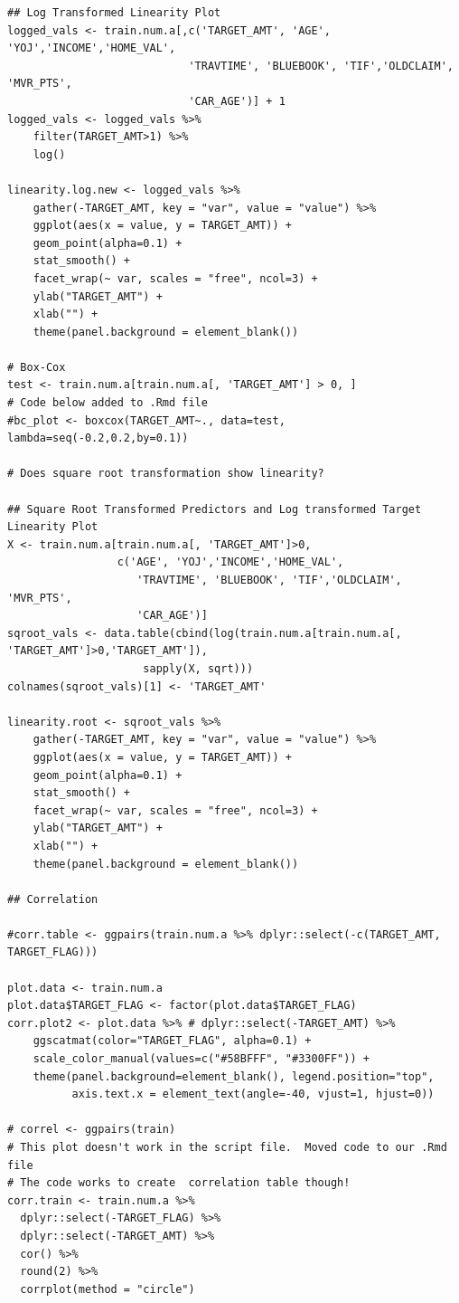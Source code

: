 \documentclass[]{article}
\begin{document}
\begin{verbatim}
## Log Transformed Linearity Plot
logged_vals <- train.num.a[,c('TARGET_AMT', 'AGE', 'YOJ','INCOME','HOME_VAL',
                            'TRAVTIME', 'BLUEBOOK', 'TIF','OLDCLAIM', 'MVR_PTS',
                            'CAR_AGE')] + 1
logged_vals <- logged_vals %>%
    filter(TARGET_AMT>1) %>%
    log()

linearity.log.new <- logged_vals %>%
    gather(-TARGET_AMT, key = "var", value = "value") %>%
    ggplot(aes(x = value, y = TARGET_AMT)) +
    geom_point(alpha=0.1) +
    stat_smooth() +
    facet_wrap(~ var, scales = "free", ncol=3) +
    ylab("TARGET_AMT") +
    xlab("") +
    theme(panel.background = element_blank())

# Box-Cox
test <- train.num.a[train.num.a[, 'TARGET_AMT'] > 0, ]
# Code below added to .Rmd file
#bc_plot <- boxcox(TARGET_AMT~., data=test, lambda=seq(-0.2,0.2,by=0.1))

# Does square root transformation show linearity?

## Square Root Transformed Predictors and Log transformed Target Linearity Plot
X <- train.num.a[train.num.a[, 'TARGET_AMT']>0,
                 c('AGE', 'YOJ','INCOME','HOME_VAL',
                    'TRAVTIME', 'BLUEBOOK', 'TIF','OLDCLAIM', 'MVR_PTS',
                    'CAR_AGE')]
sqroot_vals <- data.table(cbind(log(train.num.a[train.num.a[, 'TARGET_AMT']>0,'TARGET_AMT']),
                     sapply(X, sqrt)))
colnames(sqroot_vals)[1] <- 'TARGET_AMT'

linearity.root <- sqroot_vals %>%
    gather(-TARGET_AMT, key = "var", value = "value") %>%
    ggplot(aes(x = value, y = TARGET_AMT)) +
    geom_point(alpha=0.1) +
    stat_smooth() +
    facet_wrap(~ var, scales = "free", ncol=3) +
    ylab("TARGET_AMT") +
    xlab("") +
    theme(panel.background = element_blank())

## Correlation

#corr.table <- ggpairs(train.num.a %>% dplyr::select(-c(TARGET_AMT, TARGET_FLAG)))

plot.data <- train.num.a
plot.data$TARGET_FLAG <- factor(plot.data$TARGET_FLAG)
corr.plot2 <- plot.data %>% # dplyr::select(-TARGET_AMT) %>%
    ggscatmat(color="TARGET_FLAG", alpha=0.1) +
    scale_color_manual(values=c("#58BFFF", "#3300FF")) +
    theme(panel.background=element_blank(), legend.position="top",
          axis.text.x = element_text(angle=-40, vjust=1, hjust=0))

# correl <- ggpairs(train)
# This plot doesn't work in the script file.  Moved code to our .Rmd file
# The code works to create  correlation table though!
corr.train <- train.num.a %>%
  dplyr::select(-TARGET_FLAG) %>%
  dplyr::select(-TARGET_AMT) %>%
  cor() %>%
  round(2) %>%
  corrplot(method = "circle")


\end{verbatim}
\end{document}
